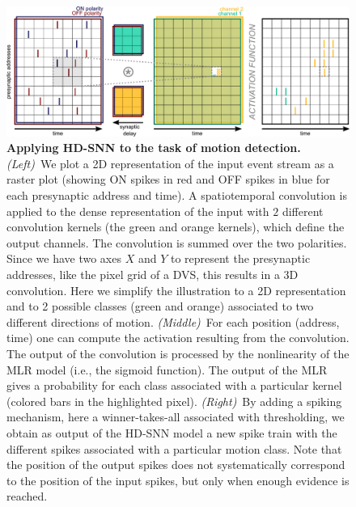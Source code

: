 \documentclass[default]{sn-jnl}%
\theoremstyle{thmstyleone}%
\theoremstyle{thmstyletwo}%
\theoremstyle{thmstylethree}%
\begin{document}
\begin{figure}%
    \centering
    \includegraphics[width=\linewidth]{figures/HDSNN_conv.pdf}
    \caption{
        \textbf{Applying HD-SNN to the task of motion detection.} \textit{(Left)}~We plot a 2D representation of the input event stream as a raster plot (showing ON spikes in red and OFF spikes in blue for each presynaptic address and time). A spatiotemporal convolution is applied to the dense representation of the input with $2$ different convolution kernels (the green and orange kernels), which define the output channels. The convolution is summed over the two polarities. Since we have two axes $X$ and $Y$ to represent the presynaptic addresses, like the pixel grid of a DVS, this results in a 3D convolution. Here we simplify the illustration to a 2D representation and to 2 possible classes (green and orange) associated to two different directions of motion. \textit{(Middle)}~For each position (address, time) one can compute the activation resulting from the convolution. The output of the convolution is processed by the nonlinearity of the MLR model (i.e., the sigmoid function). The output of the MLR gives a probability for each class associated with a particular kernel (colored bars in the highlighted pixel). \textit{(Right)}~By adding a spiking mechanism, here a winner-takes-all associated with thresholding, we obtain as output of the HD-SNN model a new spike train with the different spikes associated with a particular motion class. Note that the position of the output spikes does not systematically correspond to the position of the input spikes, but only when enough evidence is reached.
    }
    \label{fig:model}
\end{figure}
\end{document}
